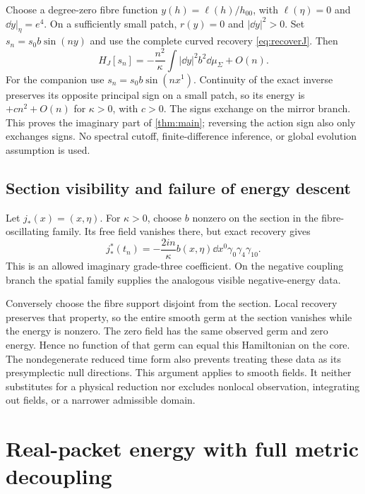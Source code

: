 Choose a degree-zero fibre function
$y(h)=\ell(h)/h_{00}$, with $\ell(\eta)=0$ and
$\dd y|_\eta=e^4$. On a sufficiently small patch,
$r(y)=0$ and $|\dd y|^2>0$. Set
$s_n=s_0b\sin(ny)$ and use the complete curved recovery
\eqref{eq:recoverJ}. Then
\begin{equation}
 H_J[s_n]=-\frac{n^2}{\kappa}
       \int |\dd y|^2b^2\dd\mu_\Sigma+O(n).
 \label{eq:Jnegative}
\end{equation}
For the companion use $s_n=s_0b\sin(nx^1)$. Continuity of the exact
inverse preserves its opposite principal sign on a small patch, so its
energy is $+c n^2+O(n)$ for $\kappa>0$, with $c>0$.
The signs exchange on the mirror branch. This proves the imaginary part
of \cref{thm:main}; reversing the action sign also only exchanges signs.
No spectral cutoff, finite-difference inference, or global evolution
assumption is used.

\subsection{Section visibility and failure of energy descent}
Let $j_*(x)=(x,\eta)$. For $\kappa>0$, choose $b$ nonzero on the section
in the fibre-oscillating family. Its free field vanishes there, but exact
recovery gives
\begin{equation}
 j_*^*(t_n)=-\frac{2in}{\kappa}b(x,\eta)\dd x^0
                 \gamma_0\gamma_4\gamma_{10}.
 \label{eq:visible}
\end{equation}
This is an allowed imaginary grade-three coefficient. On the negative
coupling branch the spatial family supplies the analogous visible
negative-energy data.

Conversely choose the fibre support disjoint from the section. Local
recovery preserves that property, so the entire smooth germ at the
section vanishes while the energy is nonzero. The zero field has the
same observed germ and zero energy. Hence no function of that germ can
equal this Hamiltonian on the core. The nondegenerate reduced time form
also prevents treating these data as its presymplectic null directions.
This argument applies to smooth fields. It neither substitutes for a
physical reduction nor excludes nonlocal observation, integrating out
fields, or a narrower admissible domain.

\section{Real-packet energy with full metric decoupling}
\label{sec:real}

